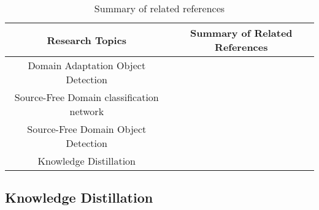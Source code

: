 \documentclass[sn-mathphys]{sn-jnl}%
\theoremstyle{thmstyleone}%
\theoremstyle{thmstyletwo}%
\theoremstyle{thmstylethree}%
\begin{document}
 
\begin{table}[]
	\begin{center}{	
			\caption{Summary of related references}		\label{table6}
			\begin{tabular}{c|c}
				\hline
				Research Topics   	&Summary of Related References 	  \\ \hline
				
				Domain Adaptation Object Detection		&\cite{chen2018domain}\cite{zheng2020cross}\cite{liu2021unbiased}\cite{he2020domain}\cite{saito2019strong}\cite{deng2021unbiased}\cite{zhu2019adapting}\cite{he2019multi}	  \\ \hline
				
				Source-Free Domain classification network	 		&\cite{kurmi2021domain}\cite{liang2020we}\cite{yang2020unsupervised} \\ \hline
				
				Source-Free Domain Object Detection			&\cite{xu2020exploring}\cite{li2020free}\cite{zhang2021source}\cite{xiong2021source}\cite{ganin2015unsupervised}	  \\ \hline
				
				Knowledge Distillation		&\cite{liu2020structured}\cite{xu2020exploring}\cite{passalis2018learning}\cite{passalis2020probabilistic}\cite{seo2020federated}\cite{xie2018improving}	  \\ \hline				
				
		\end{tabular}}	
		
	\end{center}
\end{table}


\subsection{Knowledge Distillation}
\end{document}

